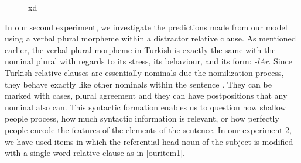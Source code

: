 \documentclass[doc]{apa6}
\begin{document}
\begin{figure}[htb!]
\centering
{}
\caption{xd}
\label{model3}
\end{figure}

In our second experiment, we investigate the predictions made from our model using a verbal plural morpheme within a distractor relative clause. As mentioned earlier, the verbal plural morpheme in Turkish is exactly the same with the nominal plural with regards to its stress, its behaviour, and its form: \emph{-lAr}. Since Turkish relative clauses are essentially nominals due the nomilization process, they behave exactly like other nominals within the sentence \autocites{Goksel2004}{Taylan2015}. They can be marked with cases, plural agreement and they can have postpositions that any nominal also can. This syntactic formation enables us to question how shallow people process, how much syntactic information is relevant, or how perfectly people encode the features of the elements of the sentence. In our experiment 2, we have used items in which the referential head noun of the subject is modified with a single-word relative clause as in \autoref{ouritem1}.
\end{document}
